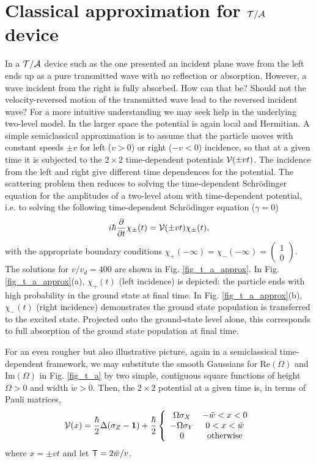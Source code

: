 \section{Classical approximation for ${\cal T/A}$ device \label{class}}
%
%
In a ${\cal T/A}$ device such as the one presented an incident plane wave from the left ends up as a pure transmitted wave with no reflection or absorption.
However, a wave incident from the right is fully absorbed. How can that be? Should not the velocity-reversed motion
of the transmitted wave lead to the reversed incident wave?
For a more intuitive understanding we may seek help in the underlying two-level model.
In the larger space the potential is again local and Hermitian. A simple semiclassical
approximation is to assume that the particle moves with  constant speeds $\pm v$ for left ($v>0$) or right ($-v<0$) incidence,  so that at a given time it is subjected to  the $2\times2$ time-dependent potentials
${\cal V}(\pm vt)$. The incidence from the left and right give different time dependences for the potential. The scattering problem then reduces to solving the time-dependent Schr\"odinger equation for the amplitudes of a two-level atom with time-dependent potential, i.e. to solving the following time-dependent Schr\"odinger equation ($\gamma = 0$)
%
\begin{eqnarray}
	i \hbar \frac{\partial}{\partial t} \chi_\pm(t)
	= {\cal V} (\pm v t) \chi_\pm(t),
\end{eqnarray}
%
with the appropriate boundary conditions $\chi_+ (-\infty) = \chi_- (-\infty) =\left(\begin{smallmatrix} 1\\ 0\end{smallmatrix}\right)$. The  solutions for $v/v_d = 400$
are shown in Fig. \ref{fig_t_a_approx}.
In Fig. \ref{fig_t_a_approx}(a), $\chi_+ (t)$ (left incidence) is depicted:  the particle ends  with high probability in the ground state at final time. In Fig. \ref{fig_t_a_approx}(b), $\chi_- (t)$ (right incidence) demonstrates  the ground state population is transferred to the excited state. Projected onto the ground-state level alone,
this corresponds to full absorption of the ground state population at final time.

For an  even rougher but also illustrative picture,  again in a semiclassical time-dependent framework, we  may substitute the smooth Gaussians for Re$(\Omega)$ and Im$(\Omega)$ in Fig. \ref{fig_t_a} by two simple, contiguous square functions of height
$\Omega>0$ and width $\tilde{w} > 0$. Then, the $2\times2$ potential at a given time is, in terms of Pauli matrices,
%
\begin{eqnarray}
	{\cal V} (x) = \frac{\hbar}{2}\Delta (\sigma_Z-{\mathbf 1})+ \frac{\hbar}{2} \left\{\begin{array}{cc}
	\Omega\sigma_X & -\tilde w < x < 0\\
	-\Omega\sigma_Y & 0 < x < \tilde w\\
	0 & \mbox{otherwise}
	\end{array}\right.
\end{eqnarray}
%
where $x = \pm v t$ and let ${\sf T}=2 \tilde w/v$.

